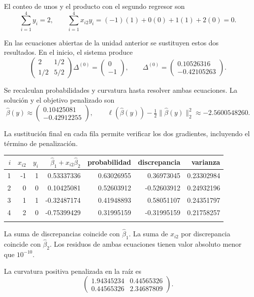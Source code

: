 \documentclass[11pt,a4paper]{article}
\begin{document}
El conteo de unos y el producto con el segundo regresor son
\[
\sum_{i=1}^4 y_i=2,\qquad\sum_{i=1}^4x_{i2}y_i=(-1)(1)+0(0)+1(1)+2(0)=0.
\]

En las ecuaciones abiertas de la unidad anterior se sustituyen
estos dos resultados. En el inicio, el sistema produce
\[
\begin{pmatrix}2&1/2\\1/2&5/2\end{pmatrix}\Delta^{(0)}=\begin{pmatrix}0\\-1\end{pmatrix},\qquad\Delta^{(0)}=\begin{pmatrix}0.10526316\\-0.42105263\end{pmatrix}.
\]

Se recalculan probabilidades y curvatura hasta resolver
ambas ecuaciones. La solución y el objetivo penalizado son
\[
\widehat\beta(y)\approx\begin{pmatrix}0.10425081\\-0.42912255\end{pmatrix},\qquad \ell(\widehat\beta(y))-\tfrac12\|\widehat\beta(y)\|_2^2\approx-2.5600548260.
\]

La sustitución final en cada fila permite verificar
los dos gradientes, incluyendo el término de penalización.
\begin{center}\scriptsize
\begin{tabular}{rrrrrrr}\toprule
\(i\)&\(x_{i2}\)&\(y_i\)&\(\widehat\beta_1+x_{i2}\widehat\beta_2\)&probabilidad&discrepancia&varianza\\\midrule
1&-1&1&0.53337336&0.63026955&0.36973045&0.23302984\\
2&0&0&0.10425081&0.52603912&-0.52603912&0.24932196\\
3&1&1&-0.32487174&0.41948893&0.58051107&0.24351797\\
4&2&0&-0.75399429&0.31995159&-0.31995159&0.21758257\\
\\\bottomrule\end{tabular}\end{center}
La suma de discrepancias coincide con \(\widehat\beta_1\).
La suma de \(x_{i2}\) por discrepancia coincide con
\(\widehat\beta_2\). Los residuos de ambas ecuaciones
tienen valor absoluto menor que \(10^{-10}\).

La curvatura positiva penalizada en la raíz es
\[
\begin{pmatrix}1.94345234&0.44565326\\0.44565326&2.34687809\end{pmatrix}.
\]
\end{document}
